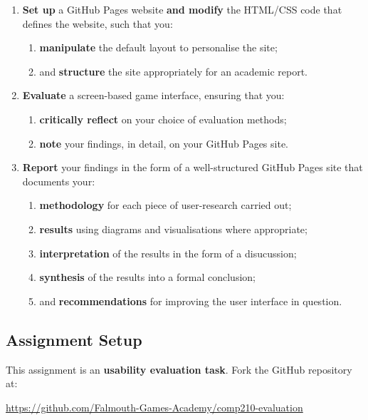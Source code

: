 \documentclass{../../../fal_assignment}
\begin{document}
\begin{enumerate}[label=(\alph*)]
    \item \textbf{Set up} a GitHub Pages website \textbf{and modify} the HTML/CSS code that defines the website, such that you: 
    	\begin{enumerate}[label=\roman*.]
    		\item \textbf{manipulate} the default layout to personalise the site;
    		\item and \textbf{structure} the site appropriately for an academic report.
	\end{enumerate}
    \item \textbf{Evaluate} a screen-based game interface, ensuring that you:
    	\begin{enumerate}[label=\roman*.]
    		\item \textbf{critically reflect} on your choice of evaluation methods;
		\item \textbf{note} your findings, in detail, on your GitHub Pages site.
	\end{enumerate}
    \item \textbf{Report} your findings in the form of a well-structured GitHub Pages site that documents your:
    	\begin{enumerate}[label=\roman*.]
    		\item \textbf{methodology} for each piece of user-research carried out;
    		\item \textbf{results} using diagrams and visualisations where appropriate;
    		\item \textbf{interpretation} of the results in the form of a disucussion;
		\item \textbf{synthesis} of the results into a formal conclusion;
    		\item and \textbf{recommendations} for improving the user interface in question.
	\end{enumerate}
	
\end{enumerate}

\subsection*{Assignment Setup}

This assignment is an \textbf{usability evaluation task}. Fork the GitHub repository at:

\indent \url{https://github.com/Falmouth-Games-Academy/comp210-evaluation}
\end{document}
